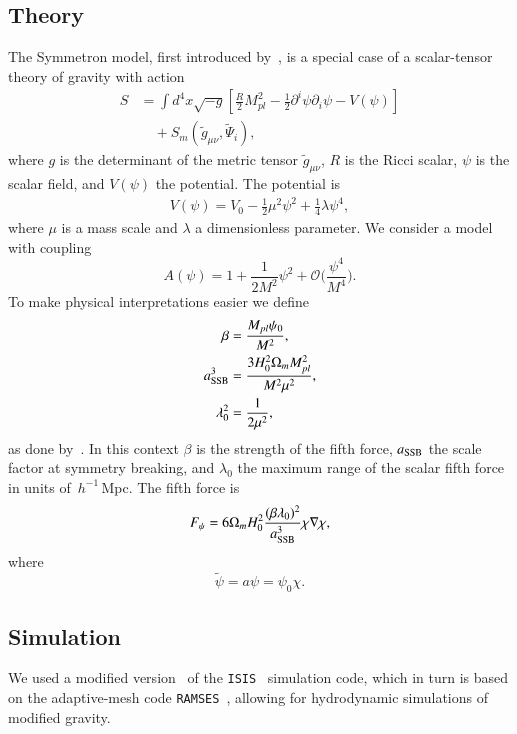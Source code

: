 \documentclass{aa}
\newcommand{\hmpc}{\,$h^{-1}$\,Mpc}
\begin{document}
\subsection{Theory}\label{sec:Symmetron}
The Symmetron model, first introduced by~\citet{hinterbichler2010screening}, is a special case of a scalar-tensor theory of gravity with action
 \begin{align}
 S &= \int d^4x\sqrt{-g}\left[\frac{R}{2}M_{pl}^2 - \frac{1}{2}\partial^i\psi\partial_i\psi - V(\psi)\right] \label{Sym_action} \\
 &\quad+ S_m(\tilde{g}_{\mu\nu},\tilde{\Psi}_i), \nonumber
 \end{align}
where $g$ is the determinant of the metric tensor $\tilde{g}_{\mu\nu}$, $R$ is the Ricci scalar, $\psi$ is the scalar field, and $V(\psi)$ the potential.
The potential is 
\begin{align}
V(\psi) = V_0-\frac{1}{2}\mu^2\psi^2 + \frac{1}{4}\lambda\psi^4,
\end{align}
where $\mu$ is a mass scale and $\lambda$ a dimensionless parameter. 
We consider a model with coupling
\begin{equation}
A(\psi) = 1 + \frac{1}{2M^2}\psi^2 + \mathcal{O}\bigg(\frac{\psi^4}{M^4}\bigg).
\end{equation}
To make physical interpretations easier we define
\begin{align}\label{sym_params}
 \beta  &= \frac{M_{pl}\psi_0}{M^2}, \\
a_{\rm{SSB}}^3 &= \frac{3H_0^2\Omega_m M_{pl}^2}{M^2\mu^2}, \\
\lambda_0^2 &= \frac{1}{2\mu^2},
\end{align}
as done by~\citet{winther2012environment}. In this context $\beta$ is the strength of the fifth force, $a_{\rm{SSB}}$ the scale factor at symmetry breaking, and $\lambda_0$ the maximum range of the scalar fifth force in units of \hmpc.
The fifth force is~\citep{hammami2015hydrodynamic}
\begin{equation}
F_\psi = 6\Omega_m H_0^2\frac{(\beta\lambda_0)^2}{a_{\rm{SSB}}^3}\chi\nabla\chi,
\end{equation}
where
\begin{equation}\label{fifth}
\tilde{\psi} = a\psi = \psi_0\chi.
\end{equation}

\subsection{Simulation}
We used a modified version~\citep{hammami2015hydrodynamic} of the \texttt{ISIS}~\citep{llinares2014isis} simulation code, which in turn is based on the adaptive-mesh code \texttt{RAMSES}~\citep{teyssier2002cosmological}, allowing for hydrodynamic simulations of modified gravity. 
\end{document}
